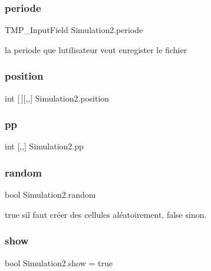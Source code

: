 \subsubsection{\texorpdfstring{periode}{periode}}
{\footnotesize\ttfamily T\+M\+P\+\_\+\+Input\+Field Simulation2.\+periode}



la periode que l\textquotesingle{}utilisateur veut enregister le fichier 

\mbox{\label{class_simulation2_ac598aba18865c6b3dccbbd8f7126e134}} 
\subsubsection{\texorpdfstring{position}{position}}
{\footnotesize\ttfamily int \mbox{[}$\,$\mbox{]}\mbox{[},,\mbox{]} Simulation2.\+position}

\mbox{\label{class_simulation2_a3ee6c95cd49428c222b8d1370c49bf96}} 
\subsubsection{\texorpdfstring{pp}{pp}}
{\footnotesize\ttfamily int \mbox{[},,\mbox{]} Simulation2.\+pp}

\mbox{\label{class_simulation2_a48db27680b5deaf8e913924a75b6916c}} 
\subsubsection{\texorpdfstring{random}{random}}
{\footnotesize\ttfamily bool Simulation2.\+random}



true s\textquotesingle{}il faut créer des cellules aléatoirement, false sinon. 

\mbox{\label{class_simulation2_afcd6fde8b8c81ef7d832b60cd1b0c6a6}} 
\subsubsection{\texorpdfstring{show}{show}}
{\footnotesize\ttfamily bool Simulation2.\+show = true}



